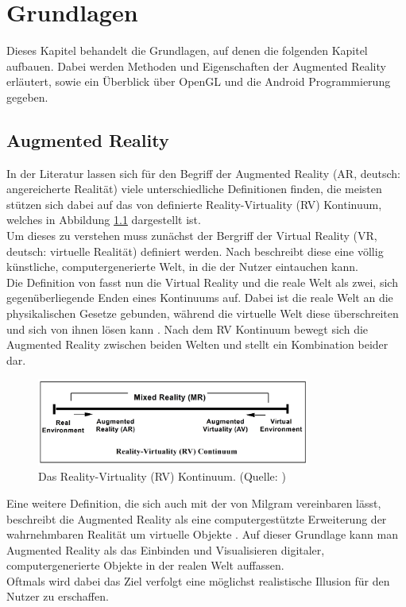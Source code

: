 \chapter{Grundlagen}\label{chapter:grundlagen}
Dieses Kapitel behandelt die Grundlagen, auf denen die folgenden Kapitel aufbauen. Dabei werden Methoden und Eigenschaften der Augmented Reality erläutert, sowie ein Überblick über OpenGL und die Android Programmierung gegeben.

\section{Augmented Reality}\label{sec:ar}
In der Literatur lassen sich für den Begriff der Augmented Reality (AR, deutsch: \glqq angereicherte Realität\grqq ) viele unterschiedliche Definitionen finden, die meisten stützen sich dabei auf das von \citet{milgram:augmented-reality} definierte Reality-Virtuality (RV) Kontinuum, welches in Abbildung \ref{fig:RV-Kontinnum} dargestellt ist.\\
Um dieses zu verstehen muss zunächst der Bergriff der Virtual Reality (VR, deutsch: \glqq virtuelle Realität\grqq ) definiert werden. Nach \citet[S.1]{klein:visual-tracking} beschreibt diese eine völlig künstliche, computergenerierte Welt, in die der Nutzer eintauchen kann. \\
Die Definition von \citeauthor{milgram:augmented-reality} fasst nun die Virtual Reality und die reale Welt als zwei, sich gegenüberliegende Enden eines Kontinuums auf. Dabei ist die reale Welt an die physikalischen Gesetze gebunden, während die virtuelle Welt diese überschreiten und sich von ihnen lösen kann \citep[S. 283]{milgram:augmented-reality}. Nach dem RV Kontinuum bewegt sich die Augmented Reality zwischen beiden Welten und stellt ein Kombination beider dar.
\begin{figure}[h!]
\centering
\includegraphics[width=0.8\textwidth]{Abbildungen/milgram-rv-continuum.jpeg}
\caption[RV Kontinuum]{Das Reality-Virtuality (RV) Kontinuum. (Quelle: \citet[S. 283]{milgram:augmented-reality})}
\label{fig:RV-Kontinnum}
\end{figure}
Eine weitere Definition, die sich auch mit der von Milgram vereinbaren lässt, beschreibt die Augmented Reality als eine computergestützte Erweiterung der wahrnehmbaren Realität um virtuelle Objekte \citep[S. 9]{tab:augmented-reality}. 
Auf dieser Grundlage kann man Augmented Reality als das Einbinden und Visualisieren digitaler, computergenerierte Objekte in der realen Welt auffassen.\\
Oftmals wird dabei das Ziel verfolgt eine möglichst realistische Illusion für den Nutzer zu erschaffen.\\

